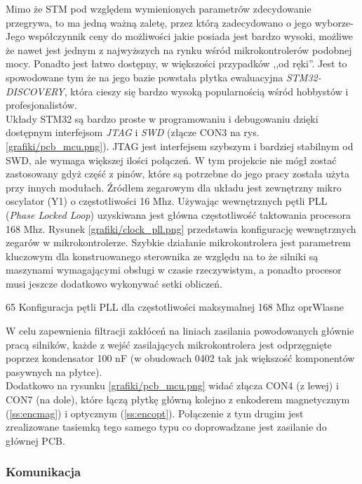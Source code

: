 Mimo że STM pod względem wymienionych parametrów zdecydowanie przegrywa, to ma jedną ważną zaletę, przez którą zadecydowano o jego wyborze- Jego współczynnik ceny do możliwości jakie posiada jest bardzo wysoki, możliwe że nawet jest jednym z najwyższych na rynku wśród mikrokontrolerów podobnej mocy. Ponadto jest łatwo dostępny, w większości przypadków ,,od ręki''. Jest to spowodowane tym że na jego bazie powstała płytka ewaluacyjna {\it STM32-DISCOVERY}, która cieszy się bardzo wysoką popularnością wśród hobbystów i profesjonalistów. \\

Układy STM32 są bardzo proste w programowaniu i debugowaniu dzięki dostępnym interfejsom {\it JTAG} i {\it SWD} (złącze CON3 na rys. \ref{grafiki/pcb_mcu.png}). JTAG jest interfejsem szybszym i bardziej stabilnym od SWD, ale wymaga większej ilości połączeń. W tym projekcie nie mógł zostać zastosowany gdyż część z pinów, które są potrzebne do jego pracy została użyta przy innych modułach. Źródłem zegarowym dla układu jest zewnętrzny mikro oscylator (Y1) o częstotliwości 16 Mhz. Używając wewnętrznych pętli PLL ({\it Phase Locked Loop}) uzyskiwana jest główna częstotliwość taktowania procesora 168 Mhz. Rysunek \ref{grafiki/clock_pll.png} przedstawia konfigurację wewnętrznych zegarów w mikrokontrolerze. Szybkie działanie mikrokontrolera jest parametrem kluczowym dla konstruowanego sterownika ze względu na to że silniki są maszynami wymagającymi obsługi w czasie rzeczywistym, a ponadto procesor musi jeszcze dodatkowo wykonywać setki obliczeń.

	{65}
	{Konfiguracja pętli PLL dla częstotliwości maksymalnej 168 Mhz}
	{oprWlasne}

W celu zapewnienia filtracji zakłóceń na liniach zasilania powodowanych głównie pracą silników, każde z wejść zasilających mikrokontrolera jest odprzęgnięte poprzez kondensator 100 nF (w obudowach 0402 tak jak większość komponentów pasywnych na płytce). \\

Dodatkowo na rysunku \ref{grafiki/pcb_mcu.png} widać złącza CON4 (z lewej) i CON7 (na dole), które łączą płytkę główną kolejno z enkoderem magnetycznym (\ref{ss:encmag}) i optycznym (\ref{ss:encopt}). Połączenie z tym drugim jest zrealizowane tasiemką tego samego typu co doprowadzane jest zasilanie do głównej PCB.

\subsubsection{Komunikacja}

